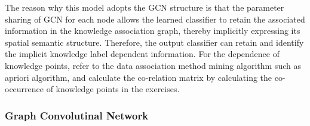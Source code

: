 The reason why this model adopts the GCN structure is that the parameter sharing of GCN for each node allows the learned classifier to retain the associated information in the knowledge association graph, thereby implicitly expressing its spatial semantic structure. Therefore, the output classifier can retain and identify the implicit knowledge label dependent information. For the dependence of knowledge points, refer to the data association method mining algorithm such as apriori algorithm, and calculate the co-relation matrix by calculating the co-occurrence of knowledge points in the exercises.

\subsubsection{Graph Convolutinal Network}






